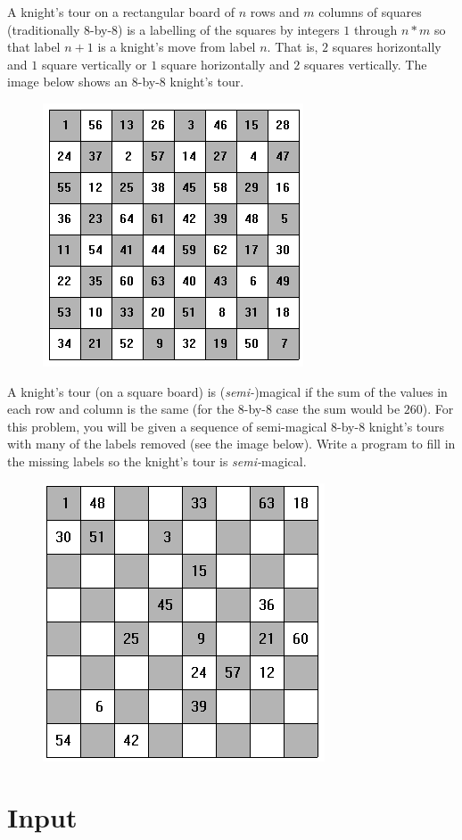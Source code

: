 
A knight's tour on a rectangular board of $n$ rows and $m$ columns of squares (traditionally 8-by-8) 
is a labelling of the squares by integers $1$ through $n * m$ so that label $n+1$ is a knight's move from label $n$.
That is, $2$ squares horizontally and $1$ square vertically or $1$ square horizontally and $2$ squares
vertically. The image below shows an 8-by-8 knight's tour.

\begin{figure}[!h]
\begin{center}
    \includegraphics[width=.35\textwidth]{knight-001.png}
\end{center}
\end{figure}

A knight's tour (on a square board) is (\emph{semi-})magical if the sum of the values in each row and column
is the same (for the 8-by-8 case the sum would be $260$). For this problem, you will be given a
sequence of semi-magical 8-by-8 knight's tours with many of the labels removed (see the image
below). Write a program to fill in the missing labels so the knight's tour is \emph{semi-}magical.

\begin{figure}[!h]
\begin{center}
    \includegraphics[width=.35\textwidth]{knight-002.png}
\end{center}
\end{figure}

\section*{Input}

